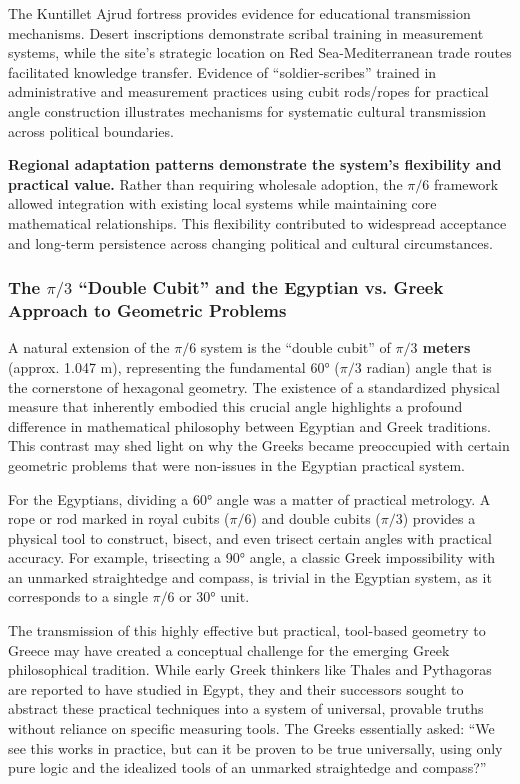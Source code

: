 \documentclass[11pt]{article}
\begin{document}
The Kuntillet Ajrud fortress provides evidence for educational transmission mechanisms. Desert inscriptions demonstrate scribal training in measurement systems, while the site's strategic location on Red Sea-Mediterranean trade routes facilitated knowledge transfer. Evidence of ``soldier-scribes'' trained in administrative and measurement practices using cubit rods/ropes for practical angle construction illustrates mechanisms for systematic cultural transmission across political boundaries.

\textbf{Regional adaptation patterns demonstrate the system's flexibility and practical value.} Rather than requiring wholesale adoption, the $\pi/6$ framework allowed integration with existing local systems while maintaining core mathematical relationships. This flexibility contributed to widespread acceptance and long-term persistence across changing political and cultural circumstances.

\subsubsection{The \texorpdfstring{$\pi/3$}{pi/3} ``Double Cubit'' and the Egyptian vs. Greek Approach to Geometric Problems}

A natural extension of the $\pi/6$ system is the ``double cubit'' of \textbf{$\pi/3$ meters} (approx. 1.047 m), representing the fundamental 60° ($\pi/3$ radian) angle that is the cornerstone of hexagonal geometry. The existence of a standardized physical measure that inherently embodied this crucial angle highlights a profound difference in mathematical philosophy between Egyptian and Greek traditions. This contrast may shed light on why the Greeks became preoccupied with certain geometric problems that were non-issues in the Egyptian practical system.

For the Egyptians, dividing a 60° angle was a matter of practical metrology. A rope or rod marked in royal cubits ($\pi/6$) and double cubits ($\pi/3$) provides a physical tool to construct, bisect, and even trisect certain angles with practical accuracy. For example, trisecting a 90° angle, a classic Greek impossibility with an unmarked straightedge and compass, is trivial in the Egyptian system, as it corresponds to a single $\pi/6$ or 30° unit.

The transmission of this highly effective but practical, tool-based geometry to Greece may have created a conceptual challenge for the emerging Greek philosophical tradition. While early Greek thinkers like Thales and Pythagoras are reported to have studied in Egypt, they and their successors sought to abstract these practical techniques into a system of universal, provable truths without reliance on specific measuring tools. The Greeks essentially asked: ``We see this works in practice, but can it be proven to be true universally, using only pure logic and the idealized tools of an unmarked straightedge and compass?''
\end{document}
